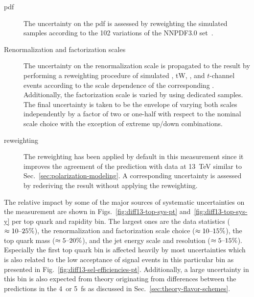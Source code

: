 \begin{description}
\item[\Acrlong{pdf}] The uncertainty on the \gls{pdf} is assessed by reweighting the simulated samples according to the 102 variations of the NNPDF3.0 set~\cite{Ball:2014uwa}.

\item[Renormalization and factorization scales] The uncertainty on the renormalization scale is propagated to the result by performing a reweighting procedure of simulated \ttbar, tW, \wjets, and $t$-channel events according to the scale dependence of the corresponding . Additionally, the factorization scale is varied by using dedicated samples. The final uncertainty is taken to be the envelope of varying both scales independently by a factor of two or one-half with respect to the nominal scale choice with the exception of extreme up/down combinations.

\item[\ttbar \pt reweighting] The \ttbar \pt reweighting has been applied by default in this measurement since it improves the agreement of the prediction with data at 13~TeV similar to Sec.~\ref{sec:polarization-modeling}. A corresponding uncertainty is assessed by rederiving the result without applying the reweighting.
\end{description}

The relative impact by some of the major sources of systematic uncertainties on the measurement are shown in Figs.~\ref{fig:diff13-top-sys-pt} and~\ref{fig:diff13-top-sys-y} per top quark \pt and rapidity bin. The largest ones are the data statistics ($\approx10\text{--}25\%$), the renormalization and factorization scale choice ($\approx10\text{--}15\%$), the top quark mass ($\approx5\text{--}20\%$), and the jet energy scale and resolution ($\approx5\text{--}15\%$). Especially the first top quark \pt bin is affected heavily by most uncertainties which is also related to the low acceptance of signal events in this particular bin as presented in Fig.~\ref{fig:diff13-sel-efficiencies-pt}. Additionally, a large uncertainty in this bin is also expected from theory originating from differences between the predictions in the 4~or 5~\gls{fs} as discussed in Sec.~\ref{sec:theory-flavor-schemes}.

